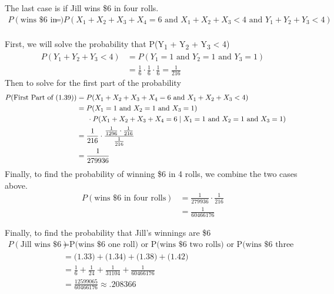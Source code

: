 \documentclass{article}
\numberwithin{equation}{section}
\newcommand{\A}{\text{ and }}
\newcommand{\eqname}[1]{\tag*{#1}}%
\begin{document}
The last case is if Jill wins \$6 in four rolls.
\begin{align}
        \label{P(Win 6 4 Roll)}
        P(\text{wins \$6 in three rolls}) &= P(X_1 + X_2 + X_3 + X_4 = 6 \A X_1 + X_2 + X_3 <  4 \A Y_1 + Y_2 + Y_3 < 4) \eqname{} \\
\end{align}

First, we will solve the probability that P(Y\textsubscript{1} + Y\textsubscript{2} + Y\textsubscript{3} < 4)
\begin{align}
        \label{P(Y_1 + Y_2 + Y_3 < 4)}
            P(Y_1 + Y_2 + Y_3 < 4) &= P(Y_1 = 1 \A Y_2 = 1 \A Y_3 = 1) \eqname{} \\
            &= \frac{1}{6} \cdot \frac{1}{6} \cdot \frac{1}{6} = \frac{1}{216}
\end{align}
Then to solve for the first part of the probability
\begin{align}
        \label{P(Win 6 4 Roll 1st part)}
        P(\text{First Part of }\text{(1.39)}) &= P(X_1 + X_2 + X_3 + X_4= 6 \A X_1 + X_2 + X_3 < 4) \eqname{} \\
        &= P(X_1 = 1 \A X_2 = 1 \A X_3 = 1) \eqname{} \\
        & \indent \cdot P(X_1 + X_2 + X_3 + X_4 = 6 \mid X_1 = 1 \A X_2 = 1 \A X_3 = 1) \eqname{} \\
        &= \frac{1}{216} \cdot \frac{\frac{1}{1296} \cdot \frac{1}{216}}{\frac{1}{216}} \eqname{} \\
        &= \frac{1}{279936} \eqname{} \\
\end{align}
Finally, to find the probability of winning \$6 in 4 rolls, we combine the two cases above.
\begin{align}
        \label{P(Win 6 4 Roll Total)}
        P(\text{wins \$6 in four rolls}) &= \frac{1}{279936} \cdot \frac{1}{216} \eqname{} \\
        &= \frac{1}{60466176}
\end{align}

Finally, to find the probability that Jill's winnings are \$6 
\begin{align}
        \label{P(Jill Wins 6 Dollar Final)}
        P(\text{Jill wins \$6}) &= \text{P(wins \$6 one roll) or P(wins \$6 two rolls) or P(wins \$6 three rolls) or P(wins \$6 four rolls)} \eqname{} \\
        &= \text{(1.33)} + \text{(1.34)} + \text{(1.38)} + \text{(1.42)} \eqname{} \\
        &= \frac{1}{6} + \frac{1}{24} + \frac{1}{31104} + \frac{1}{60466176} \eqname{} \\
        &= \frac{12599065}{60466176} \approx .208366
\end{align}
\end{document}
